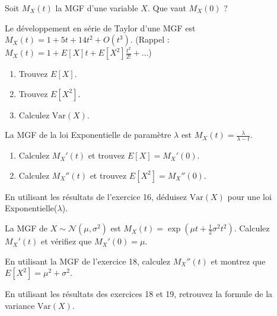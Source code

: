
\begin{exercicebox}
Soit $M_X(t)$ la MGF d'une variable $X$. Que vaut $M_X(0)$ ?
\end{exercicebox}

\begin{exercicebox}
Le développement en série de Taylor d'une MGF est $M_X(t) = 1 + 5t + 14t^2 + O(t^3)$.
(Rappel : $M_X(t) = 1 + E[X]t + E[X^2]\frac{t^2}{2!} + \dots$)
\begin{enumerate}
    \item Trouvez $E[X]$.
    \item Trouvez $E[X^2]$.
    \item Calculez $\text{Var}(X)$.
\end{enumerate}
\end{exercicebox}

\begin{exercicebox}
La MGF de la loi Exponentielle de paramètre $\lambda$ est $M_X(t) = \frac{\lambda}{\lambda - t}$.
\begin{enumerate}
    \item Calculez $M_X'(t)$ et trouvez $E[X] = M_X'(0)$.
    \item Calculez $M_X''(t)$ et trouvez $E[X^2] = M_X''(0)$.
\end{enumerate}
\end{exercicebox}

\begin{exercicebox}
En utilisant les résultats de l'exercice 16, déduisez $\text{Var}(X)$ pour une loi Exponentielle($\lambda$).
\end{exercicebox}

\begin{exercicebox}
La MGF de $X \sim \mathcal{N}(\mu, \sigma^2)$ est $M_X(t) = \exp(\mu t + \frac{1}{2}\sigma^2 t^2)$.
Calculez $M_X'(t)$ et vérifiez que $M_X'(0) = \mu$.
\end{exercicebox}

\begin{exercicebox}
En utilisant la MGF de l'exercice 18, calculez $M_X''(t)$ et montrez que $E[X^2] = \mu^2 + \sigma^2$.
\end{exercicebox}

\begin{exercicebox}
En utilisant les résultats des exercices 18 et 19, retrouvez la formule de la variance $\text{Var}(X)$.
\end{exercicebox}

